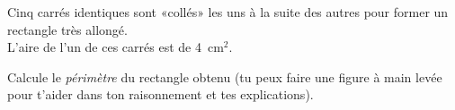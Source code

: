 Cinq carrés identiques sont «collés» les uns à la suite des autres pour former un rectangle très allongé.\\
L'aire de l'un de ces carrés est de 4~cm$^2$.

Calcule le \emph{périmètre} du rectangle obtenu (tu peux faire une
figure à main levée pour t'aider dans ton raisonnement et tes
explications).